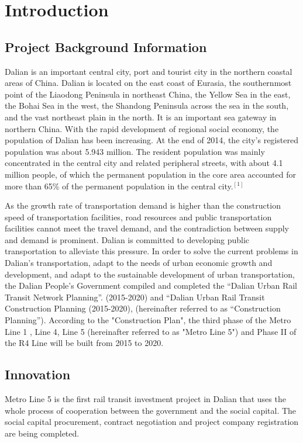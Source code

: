 \documentclass[12pt]{article}
\title{}  %
\begin{document}


\section{Introduction}
\subsection{Project Background Information}
Dalian is an important central city, port and tourist city in the northern coastal areas of China. Dalian is located on the east coast of Eurasia, the southernmost point of the Liaodong Peninsula in northeast China, the Yellow Sea in the east, the Bohai Sea in the west, the Shandong Peninsula across the sea in the south, and the vast northeast plain in the north. It is an important sea gateway in northern China. With the rapid development of regional social economy, the population of Dalian has been increasing. At the end of 2014, the city's registered population was about 5.943 million. The resident population was mainly concentrated in the central city and related peripheral streets, with about 4.1 million people, of which the permanent population in the core area accounted for more than 65\% of the permanent population in the central city.$^{[1]}$
\par As the growth rate of transportation demand is higher than the construction speed of transportation facilities, road resources and public transportation facilities cannot meet the travel demand, and the contradiction between supply and demand is prominent. Dalian is committed to developing public transportation to alleviate this pressure. In order to solve the current problems in Dalian's transportation, adapt to the needs of urban economic growth and development, and adapt to the sustainable development of urban transportation, the Dalian People's Government compiled and completed the “Dalian Urban Rail Transit Network Planning”. (2015-2020) and “Dalian Urban Rail Transit Construction Planning (2015-2020), (hereinafter referred to as “Construction Planning”). According to the "Construction Plan", the third phase of the Metro Line 1 , Line 4, Line 5 (hereinafter referred to as "Metro Line 5") and Phase II of the R4 Line will be built from 2015 to 2020.


\subsection{Innovation}
Metro Line 5 is the first rail transit investment project in Dalian that uses the whole process of cooperation between the government and the social capital. The social capital procurement, contract negotiation and project company registration are being completed.
\end{document}
